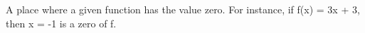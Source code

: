 A place where a given function has the value zero. For instance,
if f(x) = 3x + 3, then x = -1 is a zero of f.